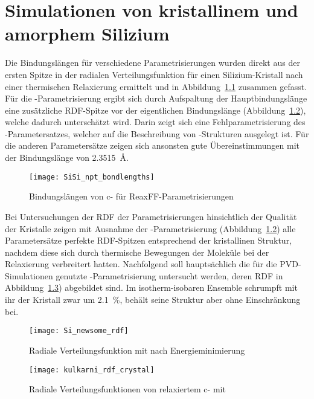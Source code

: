 \chapter{Simulationen von kristallinem und amorphem Silizium}
\label{appendix_silicon}

Die Bindungslängen für verschiedene Parametrisierungen wurden direkt aus der ersten Spitze in der radialen Verteilungsfunktion für einen Silizium-Kristall nach einer thermischen Relaxierung ermittelt und in Abbildung~\ref{fig:sisibondlengths} zusammen gefasst.
Für die -Parametrisierung ergibt sich durch Aufspaltung der Hauptbindungslänge eine zusätzliche RDF-Spitze vor der eigentlichen Bindungslänge (Abbildung~\ref{fig:newsomerdf}), welche dadurch unterschätzt wird.
Darin zeigt sich eine Fehl\-para\-metri\-sierung des -Parametersatzes, welcher auf die Beschreibung von -Strukturen ausgelegt ist.
Für die anderen Parametersätze zeigen sich ansonsten gute Übereinstimmungen mit der Bindungslänge von \SI{2.3515}{\angstrom}\cite{haynes_crc_2011}.

\begin{figure}[p]
  \centering
  \texttt{[image: SiSi\_npt\_bondlengths]}
  \caption{Bindungslängen von c- für ReaxFF-Parametrisierungen}
  \label{fig:sisibondlengths}
\end{figure}

Bei Untersuchungen der RDF der Parametrisierungen hinsichtlich der Qualität der Kristalle zeigen mit Ausnahme der -Parametrisierung (Abbildung~\ref{fig:newsomerdf}) alle Parametersätze perfekte RDF-Spitzen entsprechend der kristallinen Struktur, nachdem diese sich durch thermische Bewegungen der Moleküle bei der Relaxierung verbreitert hatten.
Nachfolgend soll hauptsächlich die für die PVD-Simulationen genutzte -Parametrisierung untersucht werden, deren RDF in Abbildung~\ref{fig:kulkarnirdf}) abgebildet sind.
Im isotherm-isobaren Ensemble schrumpft mit ihr der Kristall zwar um \SI{2.1}{\percent}, behält seine Struktur aber ohne Einschränkung bei.

\vspace{2em}

\begin{figure}[H]
  \centering
  \texttt{[image: Si\_newsome\_rdf]}
  \caption{Radiale Verteilungsfunktion mit  nach Energieminimierung}
  \label{fig:newsomerdf}
\end{figure}


\begin{figure}[p]
  \centering
  \texttt{[image: kulkarni\_rdf\_crystal]}
  \caption[Radiale Verteilungsfunktionen von relaxiertem c-]{
    Radiale Verteilungsfunktionen von relaxiertem c- mit 
  }
  \label{fig:kulkarnirdf}
\end{figure}

